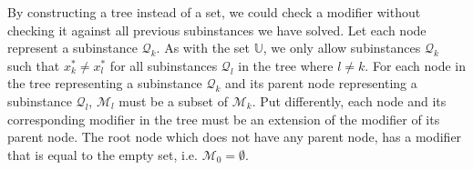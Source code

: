 By constructing a tree instead of a set, we could check a modifier without
checking it against all previous subinstances we have solved. Let each node
represent a subinstance $\mathcal{Q}_k$. As with the set $\mathbb{U}$, we only
allow subinstances $\mathcal{Q}_k$ such that $x_k^* \neq x_l^*$ for all
subinstances $\mathcal{Q}_l$ in the tree where $l \neq k$. For each node in the
tree representing a subinstance $\mathcal{Q}_k$ and its parent node
representing a subinstance $\mathcal{Q}_l$, $\mathcal{M}_l$ must be a subset of
$\mathcal{M}_k$. Put differently, each node and its corresponding modifier in
the tree must be an extension of the modifier of its parent node. The root node
which does not have any parent node, has a modifier that is equal to the empty
set, i.e. $\mathcal{M}_0 = \emptyset$.



